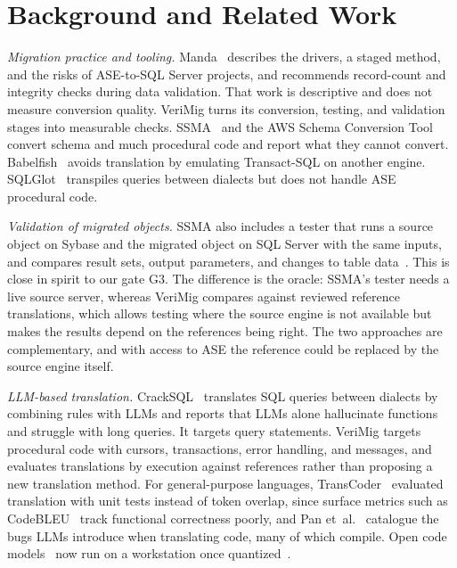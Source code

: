 \section{Background and Related Work}\label{sec:related}

\textit{Migration practice and tooling.} Manda~\cite{manda2026} describes the drivers, a staged method,
and the risks of ASE-to-SQL Server projects, and recommends record-count and integrity checks during data
validation. That work is descriptive and does not measure conversion quality. VeriMig turns its conversion,
testing, and validation stages into measurable checks. SSMA~\cite{ssma} and the AWS Schema Conversion
Tool~\cite{awssct} convert schema and much procedural code and report what they cannot convert.
Babelfish~\cite{babelfish} avoids translation by emulating Transact-SQL on another engine. SQLGlot~\cite{sqlglot}
transpiles queries between dialects but does not handle ASE procedural code.

\textit{Validation of migrated objects.} SSMA also includes a tester that runs a source object on Sybase
and the migrated object on SQL Server with the same inputs, and compares result sets, output parameters,
and changes to table data~\cite{ssma}. This is close in spirit to our gate G3. The difference is the
oracle: SSMA's tester needs a live source server, whereas VeriMig compares against reviewed reference
translations, which allows testing where the source engine is not available but makes the results depend
on the references being right. The two approaches are complementary, and with access to ASE the
reference could be replaced by the source engine itself.

\textit{LLM-based translation.} CrackSQL~\cite{zhou2025cracksql} translates SQL queries between dialects by
combining rules with LLMs and reports that LLMs alone hallucinate functions and struggle with long queries.
It targets query statements. VeriMig targets procedural code with cursors, transactions, error handling,
and messages, and evaluates translations by execution against references rather than proposing a new
translation method. For general-purpose languages, TransCoder~\cite{roziere2020} evaluated translation with
unit tests instead of token overlap, since surface metrics such as CodeBLEU~\cite{ren2020codebleu} track
functional correctness poorly, and Pan et~al.~\cite{pan2024lost} catalogue the bugs LLMs introduce when
translating code, many of which compile. Open code models~\cite{roziere2023codellama,guo2024deepseekcoder,hui2024qwen}
now run on a workstation once quantized~\cite{frantar2023gptq,llamacpp}.

